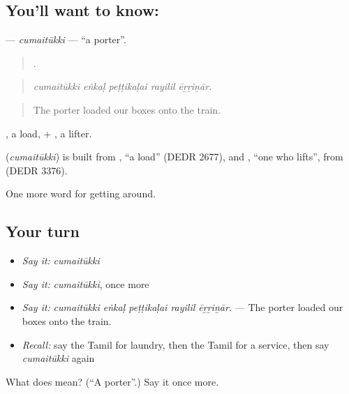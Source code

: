 \subsection*{You'll want to know: }
\textbf{} — \emph{cumaitūkki} — \textquotedblleft{}a porter\textquotedblright{}.

\begin{quote}
    .
\end{quote}

\begin{quote}
\emph{cumaitūkki eṅkaḷ peṭṭikaḷai rayilil ēṟṟiṉār.}
\end{quote}

\begin{quote}
The porter loaded our boxes onto the train.
\end{quote}

, a load, + , a lifter.

\begin{cousinweb}
\textbf{} (\emph{cumaitūkki}) is built from , \textquotedblleft{}a load\textquotedblright{} (DEDR 2677), and , \textquotedblleft{}one who lifts\textquotedblright{}, from  (DEDR 3376).
\end{cousinweb}

\begin{grammarlens}[title={What you've built}]
One more word for getting around.
\end{grammarlens}

\subsection*{Your turn}
\begin{itemize}
\raggedright
  \item \emph{Say it:} \emph{cumaitūkki}
  \item \emph{Say it:} \emph{cumaitūkki}, once more
  \item \emph{Say it:} \emph{cumaitūkki eṅkaḷ peṭṭikaḷai rayilil ēṟṟiṉār.} — The porter loaded our boxes onto the train.
  \item \emph{Recall:} say the Tamil for laundry, then the Tamil for a service, then say \emph{cumaitūkki} again
\end{itemize}

\begin{tcolorbox}[breakable,colback=teal!4,colframe=teal!35!black,title={Before you move on}]
What does  mean? (\textquotedblleft{}A porter\textquotedblright{}.) Say it once more.
\end{tcolorbox}
